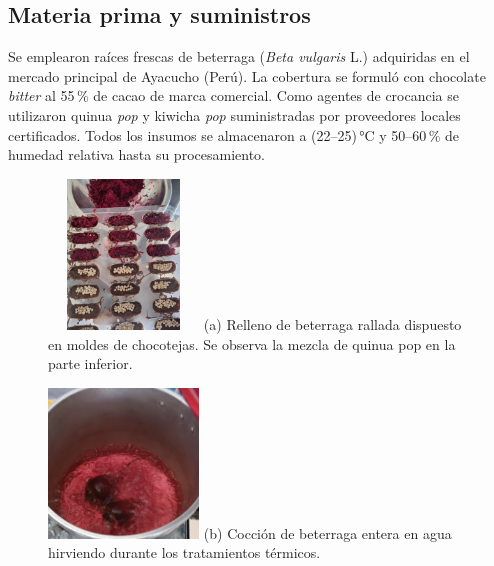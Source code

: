 \documentclass[manuscript,screen,review]{acmart}
\begin{document}
    \subsection{Materia prima y suministros}
    Se emplearon raíces frescas de beterraga (\textit{Beta vulgaris} L.) adquiridas en el mercado principal de Ayacucho (Perú).  
    La cobertura se formuló con chocolate \emph{bitter} al 55\,\% de cacao de marca comercial.  
    Como agentes de crocancia se utilizaron quinua \emph{pop} y kiwicha \emph{pop} suministradas por proveedores locales certificados.  
    Todos los insumos se almacenaron a (22–25)\,°C y 50–60\,\% de humedad relativa hasta su procesamiento.
            \begin{figure}[H]
          \centering
          \begin{minipage}{0.24\linewidth}
            \centering
            \includegraphics[width=4cm,height=4cm,keepaspectratio]{imagen/procedimiento/beterraga-quinua.jpeg}
            \small (a) Relleno de beterraga rallada dispuesto en moldes de chocotejas. Se observa la mezcla de quinua pop en la parte inferior.
          \end{minipage}
          \hspace{2em}
          \begin{minipage}{0.24\linewidth}
            \centering
            \includegraphics[width=4cm,height=4cm,keepaspectratio]{imagen/procedimiento/beterraga-cocida.jpeg}
            \small (b) Cocción de beterraga entera en agua hirviendo durante los tratamientos térmicos.
          \end{minipage}

\end{figure}
\end{document}
